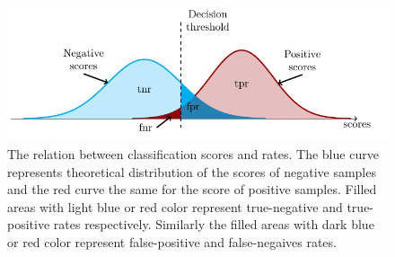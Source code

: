 \begin{figure}
  \centering
  \includegraphics[width=\linewidth]{images/confusion_rates.pdf}
  \caption{The relation between classification scores and  rates. The blue curve represents theoretical distribution of the scores of negative samples and the red curve the same for the score of positive samples. Filled areas with light blue or red color represent true-negative and true-positive rates respectively. Similarly the filled areas with dark blue or red color represent false-positive and false-negaives rates.}
  \label{fig: scores and rates}
\end{figure}

